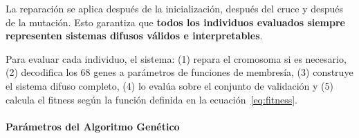\documentclass[11pt]{article}
\begin{document}
La reparaci\'on se aplica despu\'es de la inicializaci\'on, despu\'es del cruce y despu\'es de la mutaci\'on. Esto garantiza que \textbf{todos los individuos evaluados siempre representen sistemas difusos v\'alidos e interpretables}.

Para evaluar cada individuo, el sistema: (1) repara el cromosoma si es necesario, (2) decodifica los 68 genes a par\'ametros de funciones de membres\'ia, (3) construye el sistema difuso completo, (4) lo evalúa sobre el conjunto de validaci\'on y (5) calcula el fitness seg\'un la funci\'on definida en la ecuaci\'on~\eqref{eq:fitness}.

\paragraph{Parámetros del Algoritmo Genético}
\end{document}
